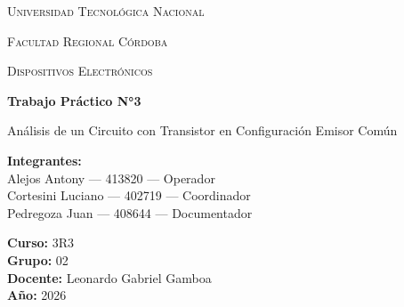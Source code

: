 \documentclass[12pt,a4paper]{report}
\begin{document}

\hypersetup{pageanchor=false}

\begin{titlepage}

    \centering

    {\scshape\LARGE Universidad Tecnológica Nacional\par}

    \vspace{0.3cm}

    {\scshape\Large Facultad Regional Córdoba\par}

    \vspace{1.5cm}

    {\scshape\Large Dispositivos Electrónicos\par}

    \vspace{2cm}

    {\Huge\bfseries Trabajo Práctico N°3\par}

    \vspace{0.5cm}

    {\LARGE
    Análisis de un Circuito con Transistor en Configuración Emisor Común
    \par}

    \vspace{2cm}

    \begin{flushleft}

        \textbf{Integrantes:}\\

        Alejos Antony --- 413820 --- Operador\\
        Cortesini Luciano --- 402719 --- Coordinador\\
        Pedregoza Juan --- 408644 --- Documentador\\

        \vspace{0.5cm}

        \textbf{Curso:} 3R3\\
        \textbf{Grupo:} 02\\
        \textbf{Docente:} Leonardo Gabriel Gamboa\\
        \textbf{Año:} 2026

    \end{flushleft}

    \vfill

\end{titlepage}
\end{document}
